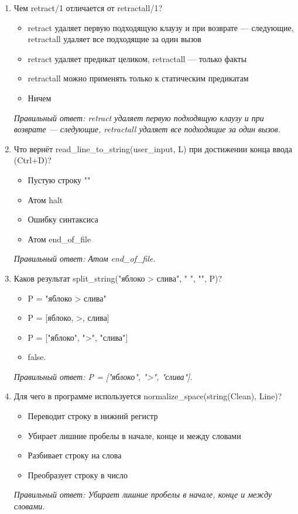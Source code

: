 \begin{enumerate}[label=\textbf{\arabic*.}, leftmargin=0pt, itemsep=1.2em]
\item Чем retract/1 отличается от retractall/1?
\begin{itemize}[label=$\square$, leftmargin=1.5cm, itemsep=0.2em, topsep=0.3em]
\item retract удаляет первую подходящую клаузу и при возврате — следующие, retractall удаляет все подходящие за один вызов
\item retract удаляет предикат целиком, retractall — только факты
\item retractall можно применять только к статическим предикатам
\item Ничем
\end{itemize}
{\small\textit{Правильный ответ: retract удаляет первую подходящую клаузу и при возврате — следующие, retractall удаляет все подходящие за один вызов.}}

\item Что вернёт read\_line\_to\_string(user\_input, L) при достижении конца ввода (Ctrl+D)?
\begin{itemize}[label=$\square$, leftmargin=1.5cm, itemsep=0.2em, topsep=0.3em]
\item Пустую строку ""
\item Атом halt
\item Ошибку синтаксиса
\item Атом end\_of\_file
\end{itemize}
{\small\textit{Правильный ответ: Атом end\_of\_file.}}

\item Каков результат split\_string("яблоко > слива", " ", "", P)?
\begin{itemize}[label=$\square$, leftmargin=1.5cm, itemsep=0.2em, topsep=0.3em]
\item P = "яблоко > слива"
\item P = [яблоко, >, слива]
\item P = ["яблоко", ">", "слива"]
\item false.
\end{itemize}
{\small\textit{Правильный ответ: P = ["яблоко", ">", "слива"].}}

\item Для чего в программе используется normalize\_space(string(Clean), Line)?
\begin{itemize}[label=$\square$, leftmargin=1.5cm, itemsep=0.2em, topsep=0.3em]
\item Переводит строку в нижний регистр
\item Убирает лишние пробелы в начале, конце и между словами
\item Разбивает строку на слова
\item Преобразует строку в число
\end{itemize}
{\small\textit{Правильный ответ: Убирает лишние пробелы в начале, конце и между словами.}}


\end{enumerate}
